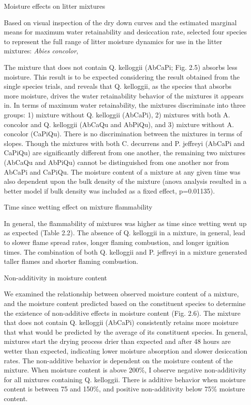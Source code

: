 \documentclass[fire,article,submit,moreauthors,pdftex]{Definitions/mdpi}
\begin{document}
Moisture effects on litter mixtures

Based on visual inspection of the dry down curves and the estimated marginal means for maximum water retainability and desiccation rate, selected four species to represent the full range of litter moisture dynamics for use in the litter mixtures: \emph{Abies concolor}, \

The mixture that does not contain Q. kelloggii (AbCaPi; Fig. 2.5) absorbs less moisture. This result is to be expected considering the result obtained from the single species trials, and reveals that Q. kelloggii, as the species that absorbs more moisture, drives the water retainability behavior of the mixtures it appears in. In terms of maximum water retainability, the mixtures discriminate into three groups: 1) mixture without Q. kelloggii (AbCaPi), 2) mixtures with both A. concolor and Q. kelloggii (AbCaQu and AbPiQu), and 3) mixture without A. concolor (CaPiQu). There is no discrimination between the mixtures in terms of slopes. Though the mixtures with both C. decurrens and P. jeffreyi (AbCaPi and CaPiQu) are significantly different from one another, the remaining two mixtures (AbCaQu and AbPiQu) cannot be distinguished from one another nor from AbCaPi and CaPiQu. The moisture content of a mixture at any given time was also dependent upon the bulk density of the mixture (anova analysis resulted in a better model if bulk density was included as a fixed effect, p=0.01135).


Time since wetting effect on mixture flammability

In general, the flammability of mixtures was higher as time since wetting went up as expected (Table 2.2). The absence of Q. kelloggii in a mixture, in general, lead to slower flame spread rates, longer flaming combustion, and longer ignition times. The combination of both Q. kelloggii and P. jeffreyi in a mixture generated taller flames and shorter flaming combustion.

Non-additivity in moisture content

We examined the relationship between observed moisture content of a mixture, and the moisture content predicted based on the constituent species to determine the existence of non-additive effects in moisture content (Fig. 2.6). The mixture that does not contain Q. kelloggii (AbCaPi) consistently retains more moisture that what would be predicted by the average of its constituent species. In general, mixtures start the drying process drier than expected and after 48 hours are wetter than expected, indicating lower moisture absorption and slower desiccation rates. The non-additive behavior is dependent on the moisture content of the mixture. When moisture content is above 200\%, I observe negative non-additivity for all mixtures containing Q. kelloggii. There is additive behavior when moisture content is between 75 and 150\%, and positive non-additivity below 75\% moisture content.
\end{document}
